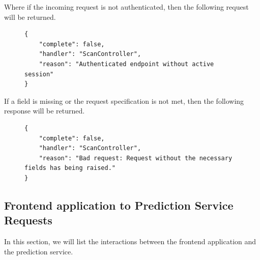 					Where if the incoming request is not authenticated, then the following request will be returned.
					\begin{figure}[H]
						\iftrue
						\begin{lstlisting}[]
{
	"complete": false,
	"handler": "ScanController",
	"reason": "Authenticated endpoint without active session"
}						
						\end{lstlisting}
					\end{figure}
					If a field is missing or the request specification is not met, then the following response will be returned.
					\begin{figure}[H]
						\iftrue
						\begin{lstlisting}[]
{
	"complete": false,
	"handler": "ScanController",
	"reason": "Bad request: Request without the necessary fields has being raised."
}					
						\end{lstlisting}
					\end{figure}
					
			\subsection{Frontend application to Prediction Service Requests}
				In this section, we will list the interactions between the frontend application and the prediction service. 
